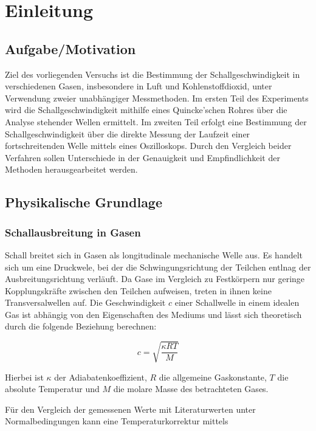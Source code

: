 \chapter{Einleitung}

\section{Aufgabe/Motivation}

Ziel des vorliegenden Versuchs ist die Bestimmung der Schallgeschwindigkeit in verschiedenen Gasen, insbesondere in Luft und Kohlenstoffdioxid, unter Verwendung zweier unabhängiger Messmethoden. Im ersten Teil des Experiments wird die Schallgeschwindigkeit mithilfe eines Quincke’schen Rohres über die Analyse stehender Wellen ermittelt. Im zweiten Teil erfolgt eine Bestimmung der Schallgeschwindigkeit über die direkte Messung der Laufzeit einer fortschreitenden Welle mittels eines Oszilloskops. Durch den Vergleich beider Verfahren sollen Unterschiede in der Genauigkeit und Empfindlichkeit der Methoden herausgearbeitet werden.

\section{Physikalische Grundlage}
\cite{demtroeder17,skript25}

\subsection{Schallausbreitung in Gasen}

Schall breitet sich in Gasen als longitudinale mechanische Welle aus. Es handelt sich um eine Druckwele, bei der die Schwingungsrichtung der Teilchen entlnag der Ausbreitungsrichtung verläuft. Da Gase im Vergleich zu Festkörpern nur geringe Kopplungskräfte zwischen den Teilchen aufweisen, treten in ihnen keine Transversalwellen auf. Die Geschwindigkeit $c$ einer Schallwelle in einem idealen Gas ist abhängig von den Eigenschaften des Mediums und lässt sich theoretisch durch die folgende Beziehung berechnen:

\begin{equation}
c = \sqrt{\frac{\kappa R T}{M}}
\label{eq:theorie_c}
\end{equation}

Hierbei ist $\kappa$ der Adiabatenkoeffizient, $R$ die allgemeine Gaskonstante, $T$ die absolute Temperatur und $M$ die molare Masse des betrachteten Gases.

Für den Vergleich der gemessenen Werte mit Literaturwerten unter Normalbedingungen kann eine Temperaturkorrektur mittels

